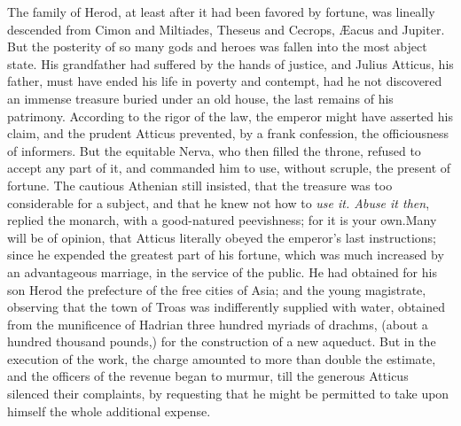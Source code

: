 

The family of Herod, at least after it had been favored by
fortune, was lineally descended from Cimon and Miltiades, Theseus
and Cecrops, Æacus and Jupiter. But the posterity of so many gods
and heroes was fallen into the most abject state. His grandfather
had suffered by the hands of justice, and Julius Atticus, his
father, must have ended his life in poverty and contempt, had he
not discovered an immense treasure buried under an old house, the
last remains of his patrimony. According to the rigor of the law,
the emperor might have asserted his claim, and the prudent
Atticus prevented, by a frank confession, the officiousness of
informers. But the equitable Nerva, who then filled the throne,
refused to accept any part of it, and commanded him to use,
without scruple, the present of fortune. The cautious Athenian
still insisted, that the treasure was too considerable for a
subject, and that he knew not how to \textit{use it. Abuse it then},
replied the monarch, with a good-natured peevishness; for it is
your own.\footnotemark[67] Many will be of opinion, that Atticus literally
obeyed the emperor’s last instructions; since he expended the
greatest part of his fortune, which was much increased by an
advantageous marriage, in the service of the public. He had
obtained for his son Herod the prefecture of the free cities of
Asia; and the young magistrate, observing that the town of Troas
was indifferently supplied with water, obtained from the
munificence of Hadrian three hundred myriads of drachms, (about a
hundred thousand pounds,) for the construction of a new aqueduct.
But in the execution of the work, the charge amounted to more
than double the estimate, and the officers of the revenue began
to murmur, till the generous Atticus silenced their complaints,
by requesting that he might be permitted to take upon himself the
whole additional expense.\footnotemark[68]


